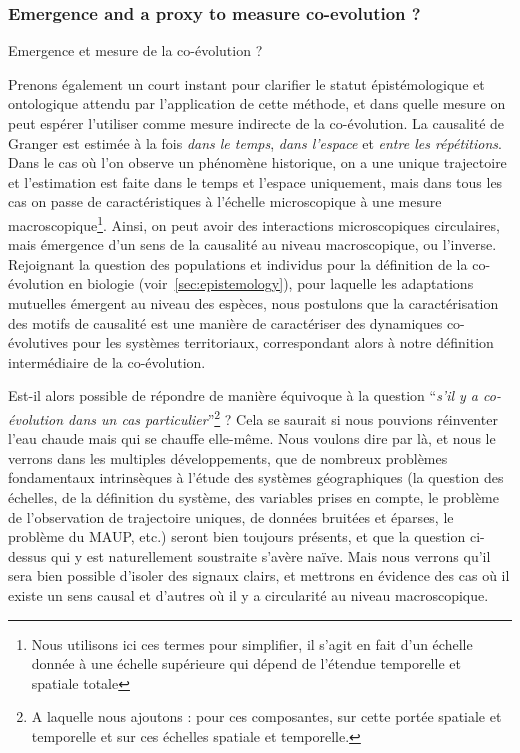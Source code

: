 


\subsubsection{Emergence and a proxy to measure co-evolution ?}{Emergence et mesure de la co-évolution ?}



Prenons également un court instant pour clarifier le statut épistémologique et ontologique attendu par l'application de cette méthode, et dans quelle mesure on peut espérer l'utiliser comme mesure indirecte de la co-évolution. La causalité de Granger est estimée à la fois \emph{dans le temps}, \emph{dans l'espace} et \emph{entre les répétitions}. Dans le cas où l'on observe un phénomène historique, on a une unique trajectoire et l'estimation est faite dans le temps et l'espace uniquement, mais dans tous les cas on passe de caractéristiques à l'échelle microscopique à une mesure macroscopique\footnote{Nous utilisons ici ces termes pour simplifier, il s'agit en fait d'un échelle donnée à une échelle supérieure qui dépend de l'étendue temporelle et spatiale totale}. Ainsi, on peut avoir des interactions microscopiques circulaires, mais émergence d'un sens de la causalité au niveau macroscopique, ou l'inverse. Rejoignant la question des populations et individus pour la définition de la co-évolution en biologie (voir~\ref{sec:epistemology}), pour laquelle les adaptations mutuelles émergent au niveau des espèces, nous postulons que la caractérisation des motifs de causalité est une manière de caractériser des dynamiques co-évolutives pour les systèmes territoriaux, correspondant alors à notre définition intermédiaire de la co-évolution.


Est-il alors possible de répondre de manière équivoque à la question ``\textit{s'il y a co-évolution dans un cas particulier}''\footnote{A laquelle nous ajoutons : pour ces composantes, sur cette portée spatiale et temporelle et sur ces échelles spatiale et temporelle.} ? Cela se saurait si nous pouvions réinventer l'eau chaude mais qui se chauffe elle-même. Nous voulons dire par là, et nous le verrons dans les multiples développements, que de nombreux problèmes fondamentaux intrinsèques à l'étude des systèmes géographiques (la question des échelles, de la définition du système, des variables prises en compte, le problème de l'observation de trajectoire uniques, de données bruitées et éparses, le problème du MAUP, etc.) seront bien toujours présents, et que la question ci-dessus qui y est naturellement soustraite s'avère naïve. Mais nous verrons qu'il sera bien possible d'isoler des signaux clairs, et mettrons en évidence des cas où il existe un sens causal et d'autres où il y a circularité au niveau macroscopique.

